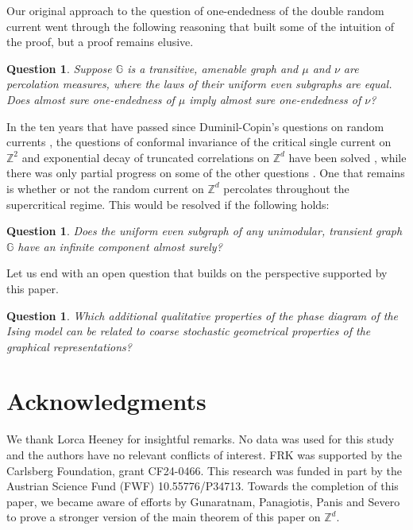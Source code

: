 \documentclass[article,11pt,reqno]{amsart}
\newcommand{\Z}{\mathbb{Z}}
\newtheorem{question}[theorem]{Question}
\begin{document}
Our original approach to the question of one-endedness of the double random current went through the following reasoning that built some of the intuition of the proof, but a proof remains elusive. 
\begin{question}
    Suppose $\mathbb{G}$ is a transitive, amenable graph and $\mu$ and $\nu$ are percolation measures, where the laws of their uniform even subgraphs are equal. Does almost sure one-endedness of $\mu$ imply almost sure one-endedness of $\nu$?
\end{question}

In the ten years that have passed since Duminil-Copin's questions on random currents \cite{DC16}, the questions of conformal invariance of the critical single current on $\Z^2$ and exponential decay of truncated correlations on $\Z^d$ have been solved \cite{chen2023conformal,duminil2020exponential}, while there was only partial progress on some of the other questions \cite{aizenman2021marginal, aizenman2019emergent, duminil2021conformal2,hansen2023uniform}. One that remains is whether or not the random current on $\mathbb{Z}^d$ percolates throughout the supercritical regime. This would be resolved if the following holds:
\begin{question}
    Does the uniform even subgraph of any unimodular, transient graph $\mathbb{G}$ have an infinite component almost surely?
\end{question}


Let us end with an open question that builds on the perspective supported by this paper.
\begin{question}
Which additional qualitative properties of the phase diagram of the Ising model can be related to coarse stochastic geometrical properties of the graphical representations?
\end{question}

\section*{Acknowledgments}
We thank Lorca Heeney for insightful remarks. No data was used for this study and the authors have no relevant conflicts of interest.   FRK was supported by the Carlsberg Foundation, grant CF24-0466. This research was funded in part by the Austrian Science Fund (FWF) 10.55776/P34713.
 Towards the completion of this paper, we became aware of efforts by Gunaratnam, Panagiotis, Panis and Severo  \cite{GPPS}  to prove a stronger version of the main theorem of this paper on $\Z^d.$



\end{document}
